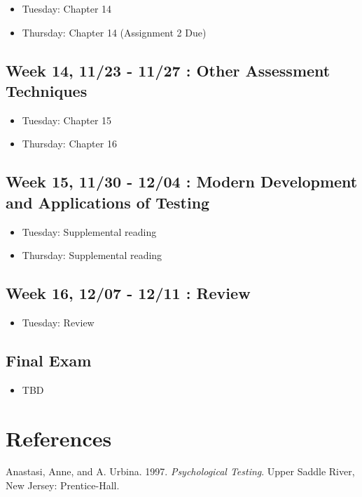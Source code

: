 \documentclass[11pt,]{article}
\providecommand{\tightlist}{%
  \setlength{\itemsep}{0pt}\setlength{\parskip}{0pt}}
\begin{document}
\begin{itemize}
\tightlist
\item
  Tuesday: Chapter 14
\item
  Thursday: Chapter 14 (Assignment 2 Due)
\end{itemize}

\subsection{Week 14, 11/23 - 11/27 : Other Assessment
Techniques}\label{week-14-1123---1127-other-assessment-techniques}

\begin{itemize}
\tightlist
\item
  Tuesday: Chapter 15
\item
  Thursday: Chapter 16
\end{itemize}

\subsection{Week 15, 11/30 - 12/04 : Modern Development and Applications
of
Testing}\label{week-15-1130---1204-modern-development-and-applications-of-testing}

\begin{itemize}
\tightlist
\item
  Tuesday: Supplemental reading
\item
  Thursday: Supplemental reading
\end{itemize}

\subsection{Week 16, 12/07 - 12/11 :
Review}\label{week-16-1207---1211-review}

\begin{itemize}
\tightlist
\item
  Tuesday: Review
\end{itemize}

\subsection{Final Exam}\label{final-exam}

\begin{itemize}
\tightlist
\item
  TBD
\end{itemize}

\section*{References}\label{references}

\hypertarget{refs}{}
\hypertarget{ref-anastasi1997}{}
Anastasi, Anne, and A. Urbina. 1997. \emph{Psychological Testing}. Upper
Saddle River, New Jersey: Prentice-Hall.
\end{document}
